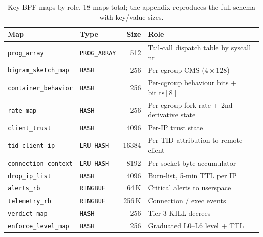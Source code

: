 \begin{table}[h]
\centering
\caption[Key BPF maps]{Key BPF maps by role. 18 maps total; the
appendix reproduces the full schema with key/value sizes.}
\label{tab:bpf-maps}
\footnotesize
\setlength\tabcolsep{4pt}
\begin{tabular}{@{}l l r p{5.9cm}@{}}
\toprule
Map & Type & Size & Role \\
\midrule
\texttt{prog\_array}         & \texttt{PROG\_ARRAY} & 512    & Tail-call dispatch table by syscall nr \\
\texttt{bigram\_sketch\_map} & \texttt{HASH}        & 256    & Per-cgroup CMS ($4 \times 128$) \\
\texttt{container\_behavior} & \texttt{HASH}        & 256    & Per-cgroup behaviour bits + $\mathrm{bit\_ts}[8]$ \\
\texttt{rate\_map}           & \texttt{HASH}        & 256    & Per-cgroup fork rate + 2nd-derivative state \\
\texttt{client\_trust}       & \texttt{HASH}        & 4096   & Per-IP trust state \\
\texttt{tid\_client\_ip}     & \texttt{LRU\_HASH}   & 16384  & Per-TID attribution to remote client \\
\texttt{connection\_context} & \texttt{LRU\_HASH}   & 8192   & Per-socket byte accumulator \\
\texttt{drop\_ip\_list}      & \texttt{HASH}        & 4096   & Burn-list, 5-min TTL per IP \\
\texttt{alerts\_rb}          & \texttt{RINGBUF}     & 64\,K  & Critical alerts to userspace \\
\texttt{telemetry\_rb}       & \texttt{RINGBUF}     & 256\,K & Connection / exec events \\
\texttt{verdict\_map}        & \texttt{HASH}        & 256    & Tier-3 KILL decrees \\
\texttt{enforce\_level\_map} & \texttt{HASH}        & 256    & Graduated L0--L6 level + TTL \\
\bottomrule
\end{tabular}
\end{table}

